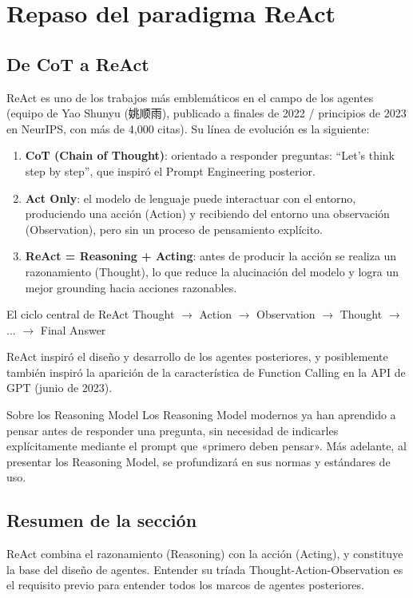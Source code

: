 \section{Repaso del paradigma ReAct}

\subsection{De CoT a ReAct}

ReAct es uno de los trabajos más emblemáticos en el campo de los agentes (equipo de Yao Shunyu (姚顺雨), publicado a finales de 2022 / principios de 2023 en NeurIPS, con más de 4,000 citas). Su línea de evolución es la siguiente:

\begin{enumerate}
    \item \textbf{CoT (Chain of Thought)}: orientado a responder preguntas: ``Let's think step by step'', que inspiró el Prompt Engineering posterior.
    \item \textbf{Act Only}: el modelo de lenguaje puede interactuar con el entorno, produciendo una acción (Action) y recibiendo del entorno una observación (Observation), pero sin un proceso de pensamiento explícito.
    \item \textbf{ReAct = Reasoning + Acting}: antes de producir la acción se realiza un razonamiento (Thought), lo que reduce la alucinación del modelo y logra un mejor grounding hacia acciones razonables.
\end{enumerate}

\begin{importantbox}{El ciclo central de ReAct}
Thought $\rightarrow$ Action $\rightarrow$ Observation $\rightarrow$ Thought $\rightarrow$ ... $\rightarrow$ Final Answer

ReAct inspiró el diseño y desarrollo de los agentes posteriores, y posiblemente también inspiró la aparición de la característica de Function Calling en la API de GPT (junio de 2023).
\end{importantbox}

\begin{knowledgebox}{Sobre los Reasoning Model}
Los Reasoning Model modernos ya han aprendido a pensar antes de responder una pregunta, sin necesidad de indicarles explícitamente mediante el prompt que «primero deben pensar». Más adelante, al presentar los Reasoning Model, se profundizará en sus normas y estándares de uso.
\end{knowledgebox}

\subsection{Resumen de la sección}
ReAct combina el razonamiento (Reasoning) con la acción (Acting), y constituye la base del diseño de agentes. Entender su tríada Thought-Action-Observation es el requisito previo para entender todos los marcos de agentes posteriores.

